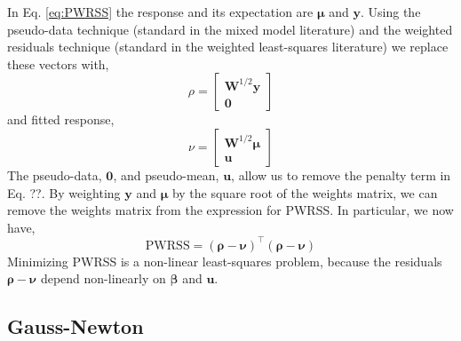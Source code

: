 \documentclass{jss}
\begin{document}
In Eq. \ref{eq:PWRSS} the response and its expectation are $\bm\mu$
and $\bm y$. Using the pseudo-data technique (standard in the mixed
model literature) and the weighted residuals technique (standard in
the weighted least-squares literature) we replace these vectors with,
\begin{equation}
  \rho = 
  \begin{bmatrix}
    \bm W^{1/2}\bm y \\
    \bm 0
  \end{bmatrix}
\end{equation}
and fitted response,
\begin{equation}
  \nu = 
  \begin{bmatrix}
    \bm W^{1/2}\bm \mu \\
    \bm u
  \end{bmatrix}
\end{equation}
The pseudo-data, $\bm 0$, and pseudo-mean, $\bm u$, allow us to remove
the penalty term in Eq. ??.  By weighting $\bm y$ and $\bm\mu$ by the
square root of the weights matrix, we can remove the weights matrix
from the expression for PWRSS. In particular, we now have,
\begin{equation}
  \mathrm{PWRSS} = (\bm\rho - \bm\nu)^\top (\bm\rho - \bm\nu)
\end{equation}
Minimizing PWRSS is a non-linear least-squares problem, because the
residuals $\bm\rho - \bm\nu$ depend non-linearly on $\bm\beta$ and
$\bm u$.

\subsection{Gauss-Newton}
\end{document}
